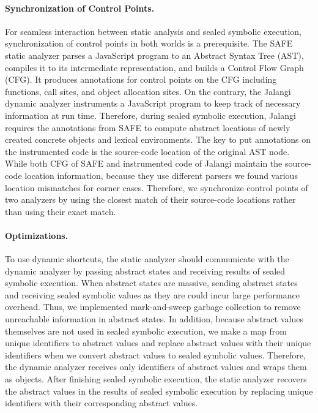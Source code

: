 \paragraph{Synchronization of Control Points.}
For seamless interaction between static analysis and sealed symbolic execution,
synchronization of control points in both worlds is a prerequisite.
The SAFE static analyzer parses a JavaScript program to an Abstract
Syntax Tree (AST), compiles it to its intermediate representation, and
builds a Control Flow Graph (CFG).  It produces annotations for
control points on the CFG including functions, call sites, and object allocation sites.
On the contrary, the Jalangi dynamic analyzer instruments a JavaScript program 
to keep track of necessary information at run time.  Therefore, during
sealed symbolic execution, Jalangi requires the annotations from SAFE to compute
abstract locations of newly created concrete objects and lexical environments.
The key to put annotations on the instrumented code is the source-code
location of the original AST node.  While both CFG of SAFE and
instrumented code of Jalangi maintain the source-code location information,
because they use different parsers we found various location mismatches for corner cases.
Therefore, we synchronize control points of two analyzers by using the closest match
of their source-code locations rather than using their exact match.

\paragraph{Optimizations.}
To use dynamic shortcuts, the static analyzer should communicate with the
dynamic analyzer by passing abstract states and receiving results of sealed
symbolic execution.  When abstract states are massive, sending
abstract states and receiving sealed symbolic values as they are could
incur large performance overhead.  Thus, we
implemented mark-and-sweep garbage collection to remove unreachable
information in abstract states.  In addition, because abstract values
themselves are not used in sealed symbolic execution, we make a map
from unique identifiers to abstract values and replace
abstract values with their unique identifiers when we convert abstract
values to sealed symbolic values.  Therefore, the dynamic analyzer
receives only identifiers of abstract values and wraps them as
 objects.  After finishing sealed symbolic execution,
the static analyzer recovers the abstract values in the results of
sealed symbolic execution by replacing unique identifiers with their
corresponding abstract values.

